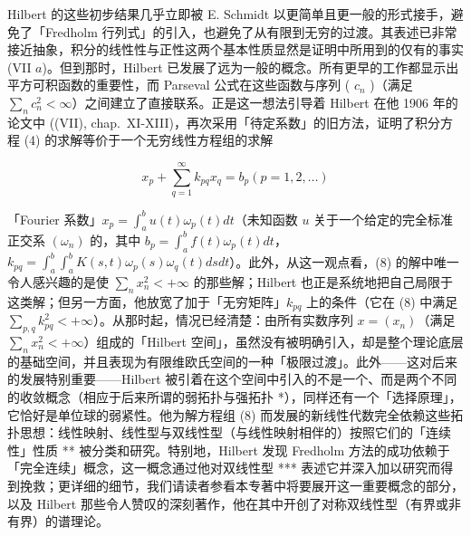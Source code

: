 Hilbert 的这些初步结果几乎立即被 E. Schmidt 以更简单且更一般的形式接手，避免了「Fredholm 行列式」的引入，也避免了从有限到无穷的过渡。其表述已非常接近抽象，积分的线性性与正性这两个基本性质显然是证明中所用到的仅有的事实 (VII \(a\))。但到那时，Hilbert 已发展了远为一般的概念。所有更早的工作都显示出平方可积函数的重要性，而 Parseval 公式在这些函数与序列 ( \(c_n\) )（满足 \(\sum_{n} c_n^2 < \infty\)）之间建立了直接联系。正是这一想法引导着 Hilbert 在他 1906 年的论文中 ((VII), chap.~XI-XIII)，再次采用「待定系数」的旧方法，证明了积分方程 (4) 的求解等价于一个无穷线性方程组的求解

\[
x _ {p} + \sum_ {q = 1} ^ {\infty} k _ {p q} x _ {q} = b _ {p} (p = 1, 2, \dots)\tag{8}
\]

「Fourier 系数」\(x_{p} = \int_{a}^{b} u(t) \omega_{p}(t) dt\)（未知函数 \(u\) 关于一个给定的完全标准正交系 \((\omega_{n})\) 的，其中 \(b_{p} = \int_{a}^{b} f(t) \omega_{p}(t) dt\)，\(k_{pq} = \int_{a}^{b} \int_{a}^{b} K(s, t) \omega_{p}(s) \omega_{q}(t) ds dt\)）。此外，从这一观点看，(8) 的解中唯一令人感兴趣的是使 \(\sum_{n} x_{n}^{2} < +\infty\) 的那些解；Hilbert 也正是系统地把自己局限于这类解；但另一方面，他放宽了加于「无穷矩阵」\(k_{pq}\) 上的条件（它在 (8) 中满足 \(\sum_{p,q} k_{pq}^{2} < +\infty\)）。从那时起，情况已经清楚：由所有实数序列 \(x = (x_{n})\)（满足 \(\sum_{n} x_{n}^{2} < +\infty\)）组成的「Hilbert 空间」，虽然没有被明确引入，却是整个理论底层的基础空间，并且表现为有限维欧氏空间的一种「极限过渡」。此外——这对后来的发展特别重要——Hilbert 被引着在这个空间中引入的不是一个、而是两个不同的收敛概念（相应于后来所谓的弱拓扑与强拓扑 *），同样还有一个「选择原理」，它恰好是单位球的弱紧性。他为解方程组 (8) 而发展的新线性代数完全依赖这些拓扑思想：线性映射、线性型与双线性型（与线性映射相伴的）按照它们的「连续性」性质 ** 被分类和研究。特别地，Hilbert 发现 Fredholm 方法的成功依赖于「完全连续」概念，这一概念通过他对双线性型 *** 表述它并深入加以研究而得到挽救；更详细的细节，我们请读者参看本专著中将要展开这一重要概念的部分，以及 Hilbert 那些令人赞叹的深刻著作，他在其中开创了对称双线性型（有界或非有界）的谱理论。

